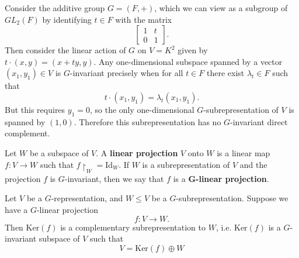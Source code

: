 \begin{frame}[plain]
\begin{example}
Consider the additive group $G = (F, +)$, which we can view as a subgroup of $GL_2 (F)$ by identifying $t \in F$ with the matrix 
\[ \begin{bmatrix} 1 & t \\ 0 & 1 \end{bmatrix}.\]
Then consider the linear action of $G$ on $V = K^2$ given by $t \cdot (x, y) = (x + ty, y)$. Any one-dimensional subspace spanned by a vector $(x_1, y_1) \in V$ is $G$-invariant precisely when for all $t \in F$ there exist $\lambda_t \in F$ such that \[ t \cdot (x_1, y_1) = \lambda_t (x_1, y_1). \]  But this requires $y_1=0$, so the only one-dimensional $G$-subrepresentation of $V$ is spanned by $(1,0)$. Therefore this subrepresentation has no $G$-invariant direct complement. 
\end{example}
\end{frame}



\begin{frame}
\begin{definition}
Let $W$ be a subspace of $V$.  A \textbf{linear projection} $V$ onto $W$ is a linear map $f \colon V \to W$ such that $f \restriction_{W} = \text{Id}_W$.  If $W$ is a subrepresentation of $V$ and the projection $f$ is $G$-invariant, then we say that $f$ is a $\mathbf{G}$\textbf{-linear projection}.
\end{definition}
\begin{lemma} \label{maschke-lemma}
Let $V$ be a $G$-representation, and $W \leq V$ be a $G$-subrepresentation.  Suppose we have a $G$-linear projection 
\[ f \colon V \to W. \]
Then $\text{Ker}(f)$ is a complementary subrepresentation to $W$, i.e. $\text{Ker}(f)$ is a $G$-invariant subspace of $V$ such that
\[ V = \text{Ker}(f) \oplus W \]
\end{lemma}
\end{frame}

